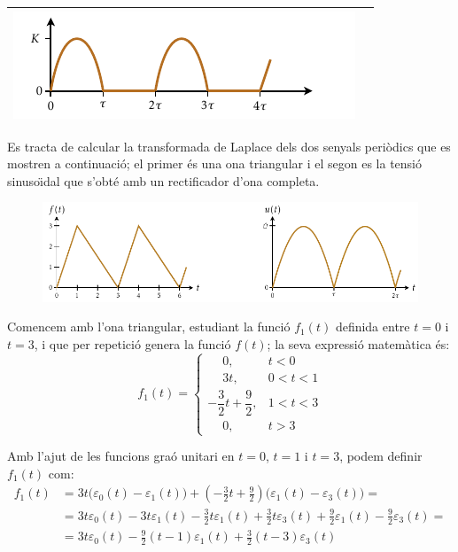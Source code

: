 \begin{longtable}{cc}
   \includegraphics{Imatges/Cap-Laplace-Funcio-15.pdf} & \raisebox{0.8cm}{$K\dfrac{\dfrac{\piup}{\tau}}{s^2+\dfrac{\piup^2}{\tau^2}}\dfrac{1}{(1-\eu^{-\tau s})}$}\\[2.4ex]
    \bottomrule[1pt]
\end{longtable}

\begin{exemple}
    Es tracta de calcular la transformada de Laplace dels dos
    senyals peri\`{o}dics que es mostren a continuaci\'{o}; el primer \'{e}s una
    ona triangular i el segon es la tensi\'{o} sinuso\"{\i}dal que s'obt\'{e} amb un
    rectificador d'ona completa.

\begin{figure}[h]
\centering
    \includegraphics{Imatges/Cap-Laplace-Exemple1.pdf}
\end{figure}

Comencem amb l'ona triangular, estudiant la funci\'{o} $f_1(t)$ definida
entre $t=0$ i $t=3$, i que per repetici\'{o} genera la funci\'{o} $f(t)$; la
seva expressi\'{o} matem\`{a}tica \'{e}s:
\[
    f_1(t) = \begin{cases}
    \phantom{-}0, & t < 0\\
    \phantom{-}3t, & 0<t<1 \\
    -\dfrac{3}{2}t +\dfrac{9}{2}, & 1 < t < 3 \\
    \phantom{-}0, & t > 3 \end{cases}
\]

Amb l'ajut de les funcions gra\'{o} unitari en $t=0$, $t=1$ i $t=3$,
podem definir $f_1(t)$ com:
\[\begin{split}
    f_1(t) &= 3t \bigl(\varepsilon_0(t) - \varepsilon_1(t)\bigr) + \left(-\frac{3}{2}t
    +\frac{9}{2}\right) \bigl(\varepsilon_1(t) -
    \varepsilon_3(t)\bigr) = \\
    &=
    3t\varepsilon_0(t)-3t\varepsilon_1(t)-\frac{3}{2}t \varepsilon_1(t)
    +\frac{3}{2}t \varepsilon_3(t) +\frac{9}{2} \varepsilon_1(t)
    -\frac{9}{2} \varepsilon_3(t) = \\
    &=3t\varepsilon_0(t) -\frac{9}{2}(t-1)\varepsilon_1(t) +
    \frac{3}{2}(t-3)\varepsilon_3(t)
\end{split}\]


\end{exemple}
